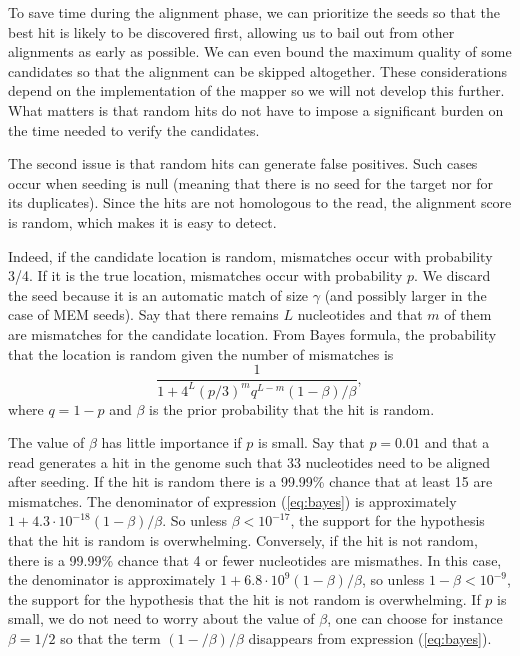 \documentclass{article}
\begin{document}
To save time during the alignment phase, we can prioritize the seeds so
that the best hit is likely to be discovered first, allowing us to bail
out from other alignments as early as possible. We can even bound the
maximum quality of some candidates so that the alignment can be skipped
altogether. These considerations depend on the implementation of the
mapper so we will not develop this further. What matters is that random
hits do not have to impose a significant burden on the time needed to
verify the candidates.

The second issue is that random hits can generate false positives. Such
cases occur when seeding is null (meaning that there is no seed for the
target nor for its duplicates). Since the hits are not homologous to the
read, the alignment score is random, which makes it is easy to detect.

Indeed, if the candidate location is random, mismatches occur with
probability 3/4. If it is the true location, mismatches occur with
probability $p$. We discard the seed because it is an automatic match of
size $\gamma$ (and possibly larger in the case of MEM seeds). Say that
there remains $L$ nucleotides and that $m$ of them are mismatches for the
candidate location. From Bayes formula, the probability that the location
is random given the number of mismatches is
\begin{equation}
\label{eq:bayes}
\frac{1}{1 + 4^L(p/3)^mq^{L-m}(1-\beta)/\beta},
\end{equation}
where $q=1-p$ and $\beta$ is the prior probability that the hit is
random.

The value of $\beta$ has little importance if $p$ is small. Say that
$p=0.01$ and that a read generates a hit in the genome such that 33
nucleotides need to be aligned after seeding. If the hit is random there
is a 99.99\% chance that at least 15 are mismatches. The denominator of
expression (\ref{eq:bayes}) is approximately $1 +
4.3\cdot10^{-18}(1-\beta)/\beta$. So unless $\beta < 10^{-17}$, the
support for the hypothesis that the hit is random is overwhelming.
Conversely, if the hit is not random, there is a 99.99\% chance that 4 or
fewer nucleotides are mismathes. In this case, the denominator is
approximately $1+6.8\cdot10^9(1-\beta)/\beta$, so unless $1-\beta <
10^{-9}$, the support for the hypothesis that the hit is not random is
overwhelming. If $p$ is small, we do not need to worry about the value of
$\beta$, one can choose for instance $\beta=1/2$ so that the term
$(1-/\beta)/\beta$ disappears from expression (\ref{eq:bayes}).
\end{document}
